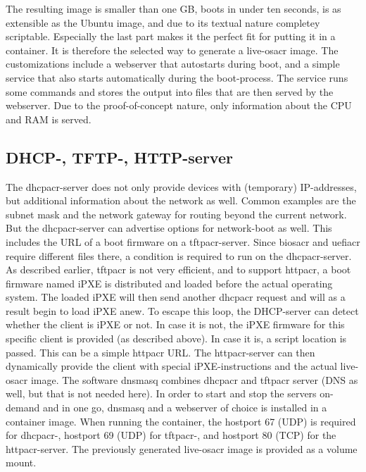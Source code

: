 The resulting image is smaller than one GB, boots in under ten seconds, is as extensible as the Ubuntu image, and due to its textual nature completey scriptable. Especially the last part makes it the perfect fit for putting it in a container. It is therefore the selected way to generate a live-\gls{osacr} image.
\newline
The customizations include a webserver that autostarts during boot, and a simple service that also starts automatically during the boot-process. The service runs some commands and stores the output into files that are then served by the webserver. Due to the proof-of-concept nature, only information about the CPU and RAM is served.

\subsection{DHCP-, TFTP-, HTTP-server}
The \gls{dhcpacr}-server does not only provide devices with (temporary) IP-addresses, but additional information about the network as well. Common examples are the subnet mask and the network gateway for routing beyond the current network. But the \gls{dhcpacr}-server can advertise options for network-boot as well. This includes the URL of a boot firmware on a \gls{tftpacr}-server. Since \gls{biosacr} and \gls{uefiacr} require different files there, a condition is required to run on the \gls{dhcpacr}-server. As described earlier, \gls{tftpacr} is not very efficient, and to support \gls{httpacr}, a boot firmware named iPXE is distributed and loaded before the actual operating system. The loaded iPXE will then send another \gls{dhcpacr} request and will as a result begin to load iPXE anew. To escape this loop, the DHCP-server can detect whether the client is iPXE or not. In case it is not, the iPXE firmware for this specific client is provided (as described above). In case it is, a script location is passed. This can be a simple \gls{httpacr} URL. The \gls{httpacr}-server can then dynamically provide the client with special iPXE-instructions and the actual live-\gls{osacr} image.
\newline
The software dnsmasq combines \gls{dhcpacr} and \gls{tftpacr} server (DNS as well, but that is not needed here). In order to start and stop the servers on-demand and in one go, dnsmasq and a webserver of choice is installed in a container image. When running the container, the hostport 67 (UDP) is required for \gls{dhcpacr}-, hostport 69 (UDP) for \gls{tftpacr}-, and hostport 80 (TCP) for the \gls{httpacr}-server. The previously generated live-\gls{osacr} image is provided as a volume mount.

